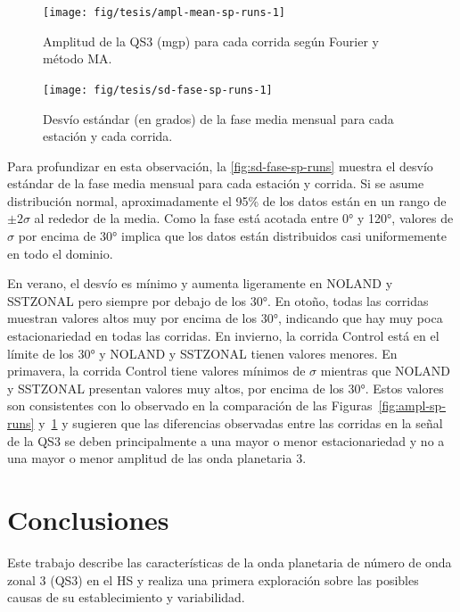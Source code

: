 \documentclass[spanish,a4paper,12pt,oneside]{book}
\begin{document}
\begin{landscape}\begin{figure}

{\centering \texttt{[image: fig/tesis/ampl-mean-sp-runs-1]} 

}

\caption{Amplitud de la QS3 (mgp) para cada corrida según Fourier y método MA.}\label{fig:ampl-mean-sp-runs}
\end{figure}
\end{landscape}

\begin{figure}
\texttt{[image: fig/tesis/sd-fase-sp-runs-1]} \caption{Desvío estándar (en grados) de la fase media mensual para cada estación y cada corrida.}\label{fig:sd-fase-sp-runs}
\end{figure}

Para profundizar en esta observación, la \autoref{fig:sd-fase-sp-runs}
muestra el desvío estándar de la fase media mensual para cada estación y
corrida. Si se asume distribución normal, aproximadamente el 95\% de los
datos están en un rango de \(\pm 2\sigma\) al rededor de la media. Como
la fase está acotada entre 0° y 120°, valores de \(\sigma\) por encima
de 30° implica que los datos están distribuidos casi uniformemente en
todo el dominio.

En verano, el desvío es mínimo y aumenta ligeramente en NOLAND y
SSTZONAL pero siempre por debajo de los 30°. En otoño, todas las
corridas muestran valores altos muy por encima de los 30°, indicando que
hay muy poca estacionariedad en todas las corridas. En invierno, la
corrida Control está en el límite de los 30° y NOLAND y SSTZONAL tienen
valores menores. En primavera, la corrida Control tiene valores mínimos
de \(\sigma\) mientras que NOLAND y SSTZONAL presentan valores muy
altos, por encima de los 30°. Estos valores son consistentes con lo
observado en la comparación de las Figuras~\ref{fig:ampl-sp-runs}
y~\ref{fig:ampl-mean-sp-runs} y sugieren que las diferencias observadas
entre las corridas en la señal de la QS3 se deben principalmente a una
mayor o menor estacionariedad y no a una mayor o menor amplitud de las
onda planetaria 3.

\hypertarget{conclusiones}{%
\chapter{Conclusiones}\label{conclusiones}}

Este trabajo describe las características de la onda planetaria de
número de onda zonal 3 (QS3) en el HS y realiza una primera exploración
sobre las posibles causas de su establecimiento y variabilidad.
\end{document}
